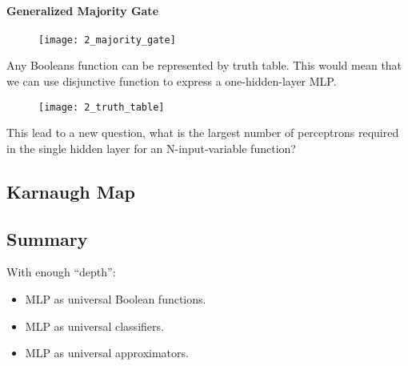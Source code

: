 \paragraph{Generalized Majority Gate}

\begin{figure}[H]
	\centering
	\texttt{[image: 2\_majority\_gate]}
\end{figure}

\hfill\break
Any Booleans function can be represented by truth table. This would mean that we can use disjunctive function to express a one-hidden-layer MLP. 

\begin{figure}[H]
	\centering
	\texttt{[image: 2\_truth\_table]}
\end{figure}

\hfill\break
This lead to a new question, what is the largest number of perceptrons required in the single hidden layer for an N-input-variable function?

\subsection{Karnaugh Map}

\begin{Karnaugh}
\end{Karnaugh}

\subsection{Summary}
With enough ``depth'':
\begin{itemize}
	\item MLP as universal Boolean functions.
	\item MLP as universal classifiers.
	\item MLP as universal approximators.
\end{itemize}
